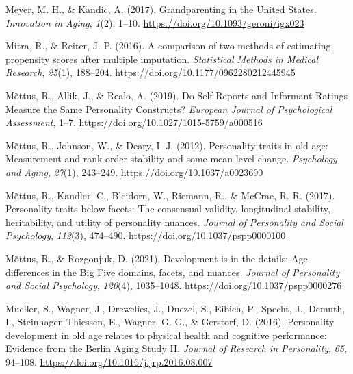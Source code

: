 \documentclass[
  english,
  man, noextraspace]{apa7}
\begin{document}
\leavevmode\hypertarget{ref-meyerGrandparentingUnitedStates2017}{}%
Meyer, M. H., \& Kandic, A. (2017). Grandparenting in the United States. \emph{Innovation in Aging}, \emph{1}(2), 1--10. \url{https://doi.org/10.1093/geroni/igx023}

\leavevmode\hypertarget{ref-mitraComparisonTwoMethods2016}{}%
Mitra, R., \& Reiter, J. P. (2016). A comparison of two methods of estimating propensity scores after multiple imputation. \emph{Statistical Methods in Medical Research}, \emph{25}(1), 188--204. \url{https://doi.org/10.1177/0962280212445945}

\leavevmode\hypertarget{ref-mottusSelfReportsInformantRatingsMeasure2019}{}%
Mõttus, R., Allik, J., \& Realo, A. (2019). Do Self-Reports and Informant-Ratings Measure the Same Personality Constructs? \emph{European Journal of Psychological Assessment}, 1--7. \url{https://doi.org/10.1027/1015-5759/a000516}

\leavevmode\hypertarget{ref-mottusPersonalityTraitsOld2012}{}%
Mõttus, R., Johnson, W., \& Deary, I. J. (2012). Personality traits in old age: Measurement and rank-order stability and some mean-level change. \emph{Psychology and Aging}, \emph{27}(1), 243--249. \url{https://doi.org/10.1037/a0023690}

\leavevmode\hypertarget{ref-mottusPersonalityTraitsFacets2017}{}%
Mõttus, R., Kandler, C., Bleidorn, W., Riemann, R., \& McCrae, R. R. (2017). Personality traits below facets: The consensual validity, longitudinal stability, heritability, and utility of personality nuances. \emph{Journal of Personality and Social Psychology}, \emph{112}(3), 474--490. \url{https://doi.org/10.1037/pspp0000100}

\leavevmode\hypertarget{ref-mottusDevelopmentDetailsAge2021}{}%
Mõttus, R., \& Rozgonjuk, D. (2021). Development is in the details: Age differences in the Big Five domains, facets, and nuances. \emph{Journal of Personality and Social Psychology}, \emph{120}(4), 1035--1048. \url{https://doi.org/10.1037/pspp0000276}

\leavevmode\hypertarget{ref-muellerPersonalityDevelopmentOld2016}{}%
Mueller, S., Wagner, J., Drewelies, J., Duezel, S., Eibich, P., Specht, J., Demuth, I., Steinhagen-Thiessen, E., Wagner, G. G., \& Gerstorf, D. (2016). Personality development in old age relates to physical health and cognitive performance: Evidence from the Berlin Aging Study II. \emph{Journal of Research in Personality}, \emph{65}, 94--108. \url{https://doi.org/10.1016/j.jrp.2016.08.007}
\end{document}
